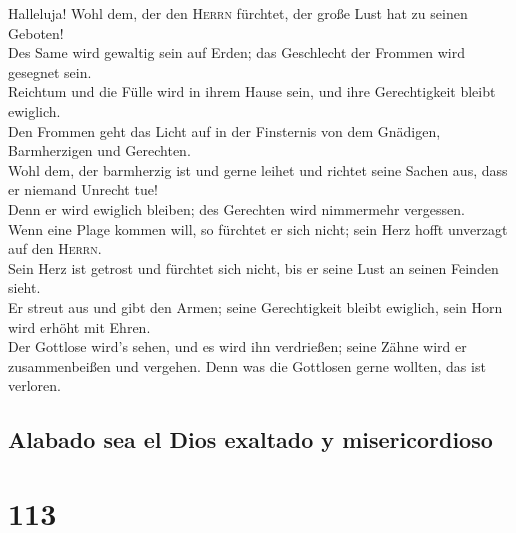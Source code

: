  Halleluja! Wohl dem, der den \textsc{Herrn} fürchtet, der
große Lust hat zu seinen Geboten!\\
 Des Same wird gewaltig sein auf Erden; das Geschlecht der
Frommen wird gesegnet sein.\\
 Reichtum und die Fülle wird in ihrem Hause sein, und ihre
Gerechtigkeit bleibt ewiglich.\\
 Den Frommen geht das Licht auf in der Finsternis von dem
Gnädigen, Barmherzigen und Gerechten.\\
 Wohl dem, der barmherzig ist und gerne leihet und richtet
seine Sachen aus, dass er niemand Unrecht tue!\\
 Denn er wird ewiglich bleiben; des Gerechten wird
nimmermehr vergessen.\\
 Wenn eine Plage kommen will, so fürchtet er sich nicht;
sein Herz hofft unverzagt auf den \textsc{Herrn}.\\
 Sein Herz ist getrost und fürchtet sich nicht, bis er
seine Lust an seinen Feinden sieht.\\
 Er streut aus und gibt den Armen; seine Gerechtigkeit
bleibt ewiglich, sein Horn wird erhöht mit Ehren.\\
 Der Gottlose wird's sehen, und es wird ihn verdrießen;
seine Zähne wird er zusammenbeißen und vergehen. Denn was die Gottlosen
gerne wollten, das ist verloren.

\hypertarget{alabado-sea-el-dios-exaltado-y-misericordioso}{%
\subsection{Alabado sea el Dios exaltado y
misericordioso}\label{alabado-sea-el-dios-exaltado-y-misericordioso}}

\hypertarget{section-112}{%
\section{113}\label{section-112}}

